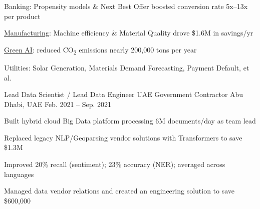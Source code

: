 \begin{cventries}
{      \begin{cvitems}
        \item {Banking: Propensity models \& Next Best Offer boosted conversion rate 5x--13x per product}
        \item {\href{https://www.datarobot.com/customers/oyak/}{Manufacturing}: Machine efficiency \& Material Quality drove \$1.6M in savings/yr}
        \item {\href{https://www.datarobot.com/wp-content/uploads/2022/01/DataRobot_CustomerSuccessStory_OYAK.pdf}{Green AI}: reduced CO\textsubscript{2} emissions nearly 200,000 tons per year}
        \item {Utilities: Solar Generation, Materials Demand Forecasting, Payment Default, et al.}
      \end{cvitems}
    }

  \cventry
    {Lead Data Scientist / Lead Data Engineer} %
    {UAE Government Contractor} %
    {Abu Dhabi, UAE} %
    {Feb. 2021 -- Sep. 2021} %
    {
      \begin{cvitems} %
        \item {Built hybrid cloud Big Data platform processing 6M documents/day as team lead}
        \item {Replaced legacy NLP/Geoparsing vendor solutions with Transformers to save \$1.3M}
        \item {Improved 20\% recall (sentiment); 23\% accuracy (NER); averaged across languages}
        \item {Managed data vendor relations and created an engineering solution to save \$600,000}
      \end{cvitems}
    }


\end{cventries}

